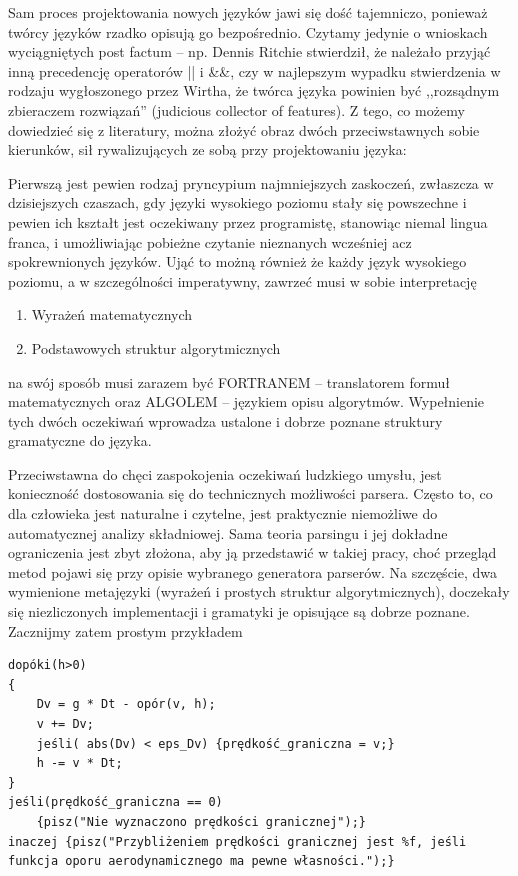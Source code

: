 Sam proces projektowania nowych języków jawi się dość tajemniczo, ponieważ twórcy języków rzadko opisują go bezpośrednio. Czytamy jedynie o wnioskach wyciągniętych post factum – np. Dennis Ritchie stwierdził, że należało przyjąć inną precedencję operatorów || i \&\&\cite{Ritchie_mail}, czy w najlepszym wypadku stwierdzenia w rodzaju wygłoszonego przez Wirtha, że twórca języka powinien być ,,rozsądnym zbieraczem rozwiązań'' (judicious collector of features)\cite{Wirth_recollections_Pascal}. Z tego, co możemy dowiedzieć się z literatury, można złożyć obraz dwóch przeciwstawnych sobie kierunków, sił rywalizujących ze sobą przy projektowaniu języka:

Pierwszą jest pewien rodzaj pryncypium najmniejszych zaskoczeń, zwłaszcza w dzisiejszych czaszach, gdy języki wysokiego poziomu stały się powszechne i pewien ich kształt jest oczekiwany przez programistę, stanowiąc niemal lingua franca, i umożliwiając pobieżne czytanie nieznanych wcześniej acz spokrewnionych języków. Ująć to możną również  że każdy język wysokiego poziomu, a w szczególności imperatywny, zawrzeć musi w sobie interpretację
\begin{enumerate}[noitemsep, label=(\alph*)]
    \item Wyrażeń matematycznych
    \item Podstawowych struktur algorytmicznych
\end{enumerate}
na swój sposób musi zarazem być FORTRANEM – translatorem formuł matematycznych oraz ALGOLEM – językiem opisu algorytmów.
Wypełnienie tych dwóch oczekiwań wprowadza ustalone i dobrze poznane struktury gramatyczne do języka.

Przeciwstawna do chęci zaspokojenia oczekiwań ludzkiego umysłu, jest konieczność dostosowania się do technicznych możliwości parsera. Często to, co dla człowieka jest naturalne i czytelne, jest praktycznie niemożliwe do automatycznej analizy składniowej.  Sama teoria parsingu i jej dokładne ograniczenia jest zbyt złożona, aby ją przedstawić w takiej pracy, choć przegląd metod pojawi się przy opisie wybranego generatora parserów. Na szczęście, dwa wymienione metajęzyki (wyrażeń i prostych struktur algorytmicznych), doczekały się niezliczonych implementacji i gramatyki je opisujące są dobrze poznane. Zacznijmy zatem prostym przykładem
\begin{lstlisting}
dopóki(h>0)
{
    Dv = g * Dt - opór(v, h);
    v += Dv;
    jeśli( abs(Dv) < eps_Dv) {prędkość_graniczna = v;}
    h -= v * Dt;
}
jeśli(prędkość_graniczna == 0)
    {pisz("Nie wyznaczono prędkości granicznej");}
inaczej {pisz("Przybliżeniem prędkości granicznej jest %f, jeśli funkcja oporu aerodynamicznego ma pewne własności.");}
\end{lstlisting}


